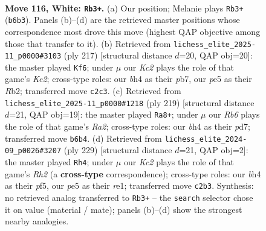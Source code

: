 \documentclass[11pt]{article}
\begin{document}
\begin{figure}[p]\centering
\begin{subfigure}{0.46\textwidth}\centering
\resizebox{\linewidth}{!}{%
\newchessgame
\chessboard[
  setfen={5n2/8/1R5p/3rp3/7b/7k/2Kp4/8 w - - 2 116},
  showmover=false,
  pgfstyle=straightmove, color=movearrow, markmove={b6-b3}
]}
\caption{}
\end{subfigure}\hfill
\begin{subfigure}{0.46\textwidth}\centering
\resizebox{\linewidth}{!}{%
\newchessgame
\chessboard[
  setfen={8/1PK1k3/4P3/4R3/8/8/1r6/8 b - - 4 109},
  showmover=false,
  pgfstyle=straightmove, color=movearrow, markmove={e7-f6}
]}
\caption{}
\end{subfigure}
\\[4pt]
\begin{subfigure}{0.46\textwidth}\centering
\resizebox{\linewidth}{!}{%
\newchessgame
\chessboard[
  setfen={4K3/r2P4/8/8/1kP5/8/8/3R4 b - - 2 110},
  showmover=false,
  pgfstyle=straightmove, color=movearrow, markmove={a7-a8}
]}
\caption{}
\end{subfigure}\hfill
\begin{subfigure}{0.46\textwidth}\centering
\resizebox{\linewidth}{!}{%
\newchessgame
\chessboard[
  setfen={3K4/1R2P2r/8/5P2/8/6k1/8/4R3 b - - 2 115},
  showmover=false,
  pgfstyle=straightmove, color=movearrow, markmove={h7-h4}
]}
\caption{}
\end{subfigure}
\caption{\textbf{Move 116, White: \texttt{Rb3+}.} (a) Our position; Melanie plays \texttt{Rb3+} (\texttt{b6b3}). Panels (b)--(d) are the retrieved master positions whose correspondence most drove this move (highest QAP objective among those that transfer to it). (b) Retrieved from \texttt{lichess\_elite\_2025-11\_p0000\#3103} (ply 217) [structural distance $d$=20, QAP obj=20]: the master played \texttt{Kf6}; under $\mu$ our \emph{Kc2} plays the role of that game's \emph{Ke2}; cross-type roles: our \emph{b}h4 as their \emph{p}b7, our \emph{p}e5 as their \emph{R}b2; transferred move \texttt{c2c3}. (c) Retrieved from \texttt{lichess\_elite\_2025-11\_p0000\#1218} (ply 219) [structural distance $d$=21, QAP obj=19]: the master played \texttt{Ra8+}; under $\mu$ our \emph{Rb6} plays the role of that game's \emph{Ra2}; cross-type roles: our \emph{b}h4 as their \emph{p}d7; transferred move \texttt{b6b4}. (d) Retrieved from \texttt{lichess\_elite\_2024-09\_p0026\#3207} (ply 229) [structural distance $d$=21, QAP obj=2]: the master played \texttt{Rh4}; under $\mu$ our \emph{Kc2} plays the role of that game's \emph{Rh2} (a \textbf{cross-type} correspondence); cross-type roles: our \emph{b}h4 as their \emph{p}f5, our \emph{p}e5 as their \emph{r}e1; transferred move \texttt{c2b3}. Synthesis: no retrieved analog transferred to \texttt{Rb3+} -- the \texttt{search} selector chose it on value (material / mate); panels (b)--(d) show the strongest nearby analogies.}
\label{fig:thought-m230}
\end{figure}
\end{document}
